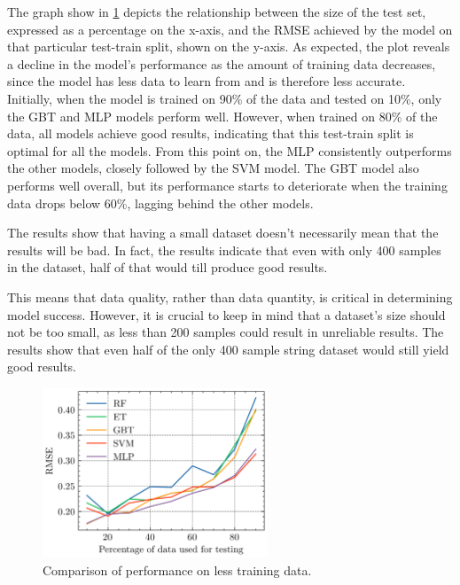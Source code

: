 The graph show in \cref{fig:results-missing-values} depicts the relationship between the size of the test set,
expressed as a
percentage
on the
x-axis, and
the RMSE achieved by the model on that particular test-train split, shown on the y-axis.
As expected, the plot reveals a decline in the model's performance as the amount of training data decreases, since the
model has less data to learn from and is therefore less accurate.
Initially, when the model is trained on 90\% of the data and tested on 10\%, only the GBT and MLP models perform well.
However, when trained on 80\% of the data, all models achieve good results, indicating that this test-train split is
optimal for all the models.
From this point on, the MLP consistently outperforms the other models, closely followed by the SVM model. The GBT
model also performs well overall, but its performance starts to deteriorate when the training data drops below 60\%,
lagging behind the other models.

The results show that having a small dataset doesn't necessarily mean that the results will be bad.
In fact, the results indicate that even with only 400 samples in the dataset, half of that would till produce good
results.

This means that data quality, rather than data quantity, is critical in determining model success.
However, it is crucial to keep in mind that a dataset's size should not be too small, as less than 200 samples could
result in unreliable results.
The results show that even half of the only 400 sample string dataset would still yield good results.

\begin{figure}[h]
    \begin{tcolorbox}[arc=0pt,boxrule=0.5pt]
        \centering
        \includegraphics[width=0.6\textwidth]{chap5/images/missing_values_plot}
    \end{tcolorbox}
    \caption{Comparison of performance on less training data.}
    \label{fig:results-missing-values}
\end{figure}

